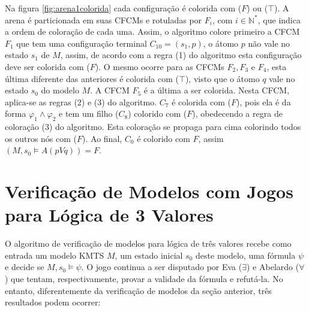\documentclass[normaltoc,capchap,capsec,times]{abnt}
\begin{document}
Na figura \ref{fig:arena1colorida} cada configuração é colorida com ($F$) ou ($\top$). A arena é particionada em suas CFCMs e  rotuladas por $F_i$, com $i \in \mathbb{N}^*$, que indica a ordem de coloração de cada uma. Assim, o algoritmo colore primeiro a CFCM $F_1$ que tem uma configuração terminal $C_{10}=(s_1,p)$, o átomo $p$ não vale no estado $s_1$ de $M$, assim, de acordo com a regra (1) do algoritmo esta configuração deve ser colorida com ($F$). O mesmo ocorre para as CFCMs $F_2,F_3$ e $F_4$, esta última diferente das anteriores é colorida com ($\top$), visto que o átomo $q$ vale no estado $s_0$ do modelo $M$. A CFCM $F_5$ é a última a ser colorida. Nesta CFCM, aplica-se  as regras  (2) e (3) do algoritmo. $C_7$ é colorida com ($F$), pois ela é da forma $\varphi_1 \wedge \varphi_2$ e tem um filho ($C_8$) colorido com ($F$), obedecendo a regra de coloração (3) do algoritmo. Esta coloração se propaga para cima colorindo todos os outros nós com ($F$). Ao final, $C_0$ é colorido com $F$, assim $(M,s_0 \models A(pVq))=F$.



\section{Verificação de Modelos com Jogos para Lógica de 3 Valores }\label{sec:modelchecking3valores}

O algoritmo de verificação de modelos para lógica de três valores recebe como entrada um modelo KMTS $M$, um estado inicial $s_0$ deste modelo, uma fórmula $\psi$ e decide se $M,s_0 \models \psi$. O jogo continua a ser disputado por Eva ($\exists$) e Abelardo ($\forall$) que tentam, respectivamente, provar a validade da fórmula e refutá-la. No entanto, diferentemente da verificação de modelos da seção anterior, três resultados podem ocorrer:
\end{document}
